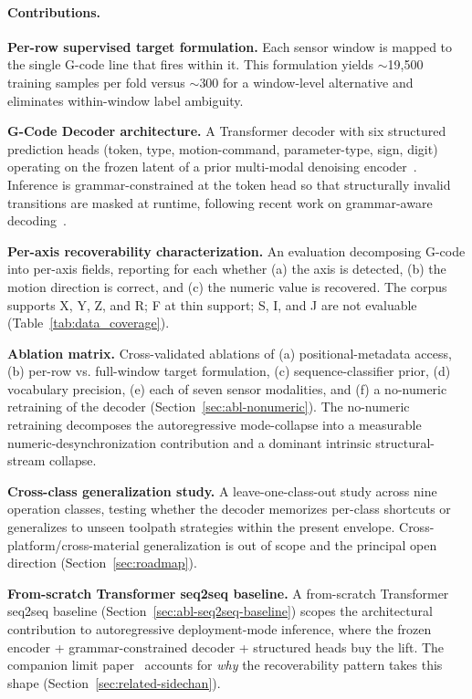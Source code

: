 \documentclass[sensors,article,submit,moreauthors,pdftex]{Definitions/mdpi}
\newcommand{\modelname}{G-Code Decoder}
\begin{document}
\paragraph{Contributions.}
\begin{enumerate}[label=\textbf{(\arabic*)}, leftmargin=*]\let\item\olditem
\item \textbf{Per-row supervised target formulation.} Each sensor window is mapped to the single G-code line that fires within it. This formulation yields $\sim$19{,}500 training samples per fold versus $\sim$300 for a window-level alternative and eliminates within-window label ambiguity.

\item \textbf{\modelname{} architecture.} A Transformer decoder with six structured prediction heads (token, type, motion-command, parameter-type, sign, digit) operating on the frozen latent of a prior multi-modal denoising encoder~\cite{encoder_paper}. Inference is grammar-constrained at the token head so that structurally invalid transitions are masked at runtime, following recent work on grammar-aware decoding~\cite{picard,outlines,xgrammar}.

\item \textbf{Per-axis recoverability characterization.} An evaluation decomposing G-code into per-axis fields, reporting for each whether (a) the axis is detected, (b) the motion direction is correct, and (c) the numeric value is recovered. The corpus supports X, Y, Z, and R; F at thin support; S, I, and J are not evaluable (Table~\ref{tab:data_coverage}).

\item \textbf{Ablation matrix.} Cross-validated ablations of (a) positional-metadata access, (b) per-row vs. full-window target formulation, (c) sequence-classifier prior, (d) vocabulary precision, (e) each of seven sensor modalities, and (f) a no-numeric retraining of the decoder (Section~\ref{sec:abl-nonumeric}). The no-numeric retraining decomposes the autoregressive mode-collapse into a measurable numeric-desynchronization contribution and a dominant intrinsic structural-stream collapse.

\item \textbf{Cross-class generalization study.} A leave-one-class-out study across nine operation classes, testing whether the decoder memorizes per-class shortcuts or generalizes to unseen toolpath strategies within the present envelope. Cross-platform/cross-material generalization is out of scope and the principal open direction (Section~\ref{sec:roadmap}).

\item \textbf{From-scratch Transformer seq2seq baseline.} A from-scratch Transformer seq2seq baseline (Section~\ref{sec:abl-seq2seq-baseline}) scopes the architectural contribution to autoregressive deployment-mode inference, where the frozen encoder + grammar-constrained decoder + structured heads buy the lift. The companion limit paper~\cite{paperB_entropy} accounts for \emph{why} the recoverability pattern takes this shape (Section~\ref{sec:related-sidechan}).
\end{enumerate}
\end{document}
